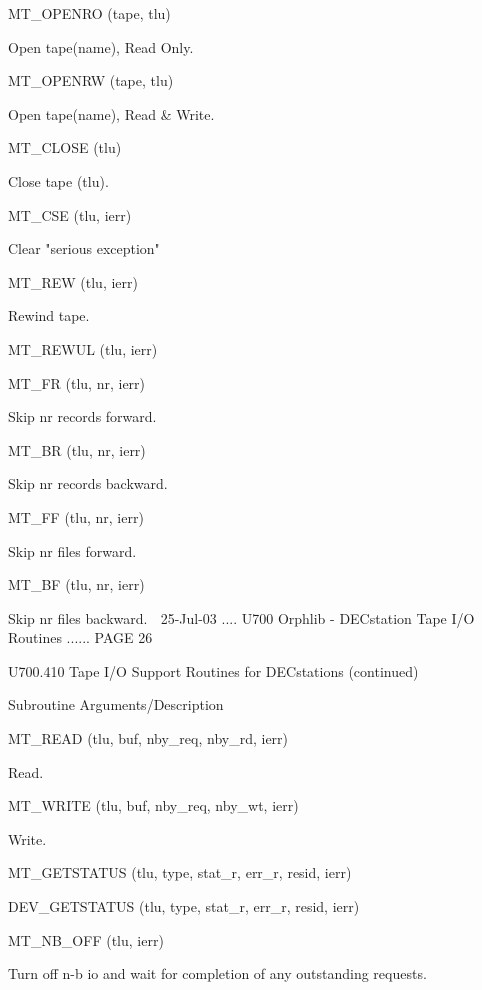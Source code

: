    MT_OPENRO          (tape, tlu)
 
                       Open tape(name), Read Only.
 
   MT_OPENRW          (tape, tlu)
 
                       Open tape(name), Read & Write.
 
   MT_CLOSE           (tlu)
 
                       Close tape (tlu).
 
   MT_CSE             (tlu, ierr)
 
                       Clear "serious exception"
 
   MT_REW             (tlu, ierr)
 
                       Rewind tape.
 
   MT_REWUL           (tlu, ierr)
 
 
   MT_FR              (tlu, nr, ierr)
 
                       Skip nr records forward.
 
   MT_BR              (tlu, nr, ierr)
 
                       Skip nr records backward.
 
   MT_FF              (tlu, nr, ierr)
 
                       Skip nr files forward.
 
   MT_BF              (tlu, nr, ierr)
 
                       Skip nr files backward.
    
   25-Jul-03 .... U700  Orphlib - DECstation Tape I/O Routines ...... PAGE  26
 
 
   U700.410  Tape I/O Support Routines for DECstations (continued)
 
 
   Subroutine          Arguments/Description
 
   MT_READ            (tlu, buf, nby_req, nby_rd, ierr)
 
                       Read.
 
   MT_WRITE           (tlu, buf, nby_req, nby_wt, ierr)
 
                       Write.
 
   MT_GETSTATUS       (tlu, type, stat_r, err_r, resid, ierr)
 
 
   DEV_GETSTATUS      (tlu, type, stat_r, err_r, resid, ierr)
 
 
   MT_NB_OFF          (tlu, ierr)
 
                       Turn off n-b io and wait for completion of any
                       outstanding requests.
 
